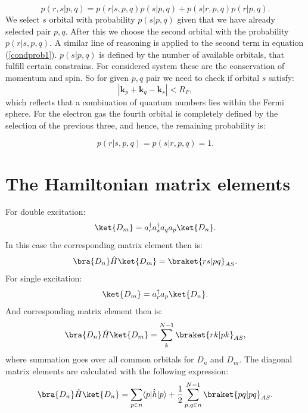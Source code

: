 \documentclass[twoside,english]{uiofysmaster}
\begin{document}
\begin{equation}\label{condprob1}
p(r,s|p,q) = p(r|s,p,q)p(s|p,q) + p(s|r,p,q)p(r|p,q).
\end{equation}
We select $s$ orbital with probability $p(s|p,q)$ given that we have already selected pair $p,q$. After this we choose the second orbital with the probability $p(r|s,p,q)$. A similar line of reasoning is applied to the second term in equation (\ref{condprob1}). $p(s|p,q)$ is defined by the number of available orbitals, that fulfill certain constrains. For considered system these are the conservation of momentum and spin. So for given $p,q$ pair we need to check if orbital $s$ satisfy:
\begin{equation}
|\boldsymbol{k}_p + \boldsymbol{k}_q - \boldsymbol{k}_s|  < R_F,
\end{equation} 
which reflects that a combination of quantum numbers lies within the Fermi sphere.
For the electron gas the fourth orbital is completely defined by the selection of the previous three, and hence, the remaining probability is:

\begin{equation}
p(r|s,p,q) = p(s|r,p,q) = 1.
\end{equation}

\section{The Hamiltonian matrix elements}

For double excitation:
\begin{equation}
\ket{D_{m}}=a^\dagger_r a^\dagger_s a_q a_p \ket{D_n}.
\end{equation}
In this case the corresponding matrix element then is:
\begin{equation}
\bra{D_n} \hat{H}\ket{D_{m}}=\braket{rs|pq}_{AS}.
\end{equation}
For single excitation:
\begin{equation}
\ket{D_{m}}=a^\dagger_r  a_p \ket{D_n}.
\end{equation}
And corresponding matrix element then is:
\begin{equation}
\bra{D_n} \hat{H}\ket{D_{m}}=\sum_{k}^{N-1}\braket{rk|pk}_{AS},
\end{equation}
where summation goes over all common orbitals  for $D_n$ and $D_m$.
The diagonal matrix elements are calculated with the following expression:
\begin{equation}
\bra{D_n} \hat{H}\ket{D_{n}}=\sum_{p\in n} \langle p|\hat{h}|p\rangle + \frac{1}{2} \sum_{p,q \in n}^{N-1}\braket{pq|pq}_{AS}.
\end{equation}
\end{document}
